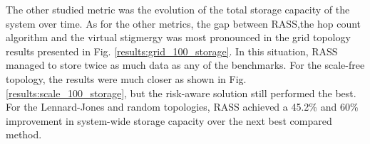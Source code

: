 
The other studied metric was the evolution of the total storage capacity of the system over time. As for the other metrics, the gap between \ac{RASS},the hop count algorithm and the virtual stigmergy was most pronounced in the grid topology results presented in Fig. \ref{results:grid_100_storage}. In this situation, \ac{RASS} managed to store twice as much data as any of the benchmarks. For the scale-free topology, the results were much closer as shown in Fig. \ref{results:scale_100_storage}, but the risk-aware solution still performed the best. For the Lennard-Jones and random topologies, \ac{RASS} achieved a 45.2\% and 60\% improvement in system-wide storage capacity over the next best compared method.

